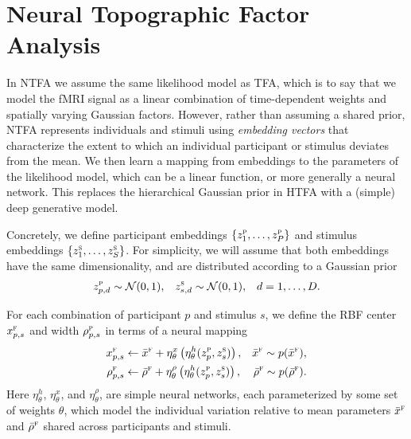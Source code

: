 \documentclass{article}
\newcommand{\scf}{\textsc{f}}
\newcommand{\scp}{\textsc{p}}
\newcommand{\scs}{\textsc{s}}
\begin{document}
\section{Neural Topographic Factor Analysis}
\label{sec:dtfa-basic}

In NTFA we assume the same likelihood model as TFA, which is to say that we model the fMRI signal as a linear combination of time-dependent weights and spatially varying Gaussian factors. However, rather than assuming a shared prior, NTFA represents individuals and stimuli using \emph{embedding vectors} that characterize the extent to which an individual participant or stimulus deviates from the mean. We then learn a mapping from embeddings to the parameters of the likelihood model, which can be a linear function, or more generally a neural network. This replaces the hierarchical Gaussian prior in HTFA with a (simple) deep generative model.

Concretely, we define participant embeddings $\{z^\scp_1, \ldots, z^\scp_P\}$ and stimulus embeddings $\{z^\scs_1, \ldots, z^\scs_S\}$. For simplicity, we will assume that both embeddings have the same dimensionality, and are distributed according to a Gaussian prior
\begin{align}
    z_{p,d}^\scp &\sim \mathcal{N}(0,1), 
    &
    z_{s,d}^\scs &\sim \mathcal{N}(0,1),
    &
    d = 1, \ldots, D.
\end{align}

For each combination of participant $p$ and stimulus $s$, we define the RBF center $x_{p,s}^\scf$ and width $\rho_{p,s}^\scp$ in terms of a neural mapping 
\begin{align}
    x_{p,s}^\scf &\leftarrow \bar{x}^\scf + \eta^{x}_\theta \left( \eta^h_\theta (z_p^\scp, z_s^\scs) \right),
    &    
    \bar{x}^\scf \sim p(\bar{x}^\scf),
    \\
    \rho_{p,s}^\scf &\leftarrow \bar{\rho}^\scf + \eta^{\rho}_\theta \left( \eta^h_\theta (z_{p}^\scp, z_{s}^\scs) \right),
    &    
    \bar{\rho}^\scf \sim p(\bar{\rho}^\scf).
\end{align}
Here $\eta_\theta^h$, $\eta_\theta^x$, and $\eta_\theta^\rho$, are simple neural networks, each parameterized by some set of weights $\theta$, which model the individual variation relative to mean parameters $\bar{x}^\scf$ and $\bar{\rho}^\scf$ shared across participants and stimuli. 
\end{document}
